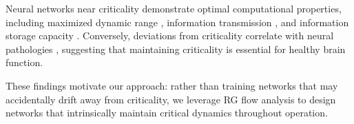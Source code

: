 Neural networks near criticality demonstrate optimal computational properties, including maximized dynamic range \cite{Kinouchietal2006, Shewetal2009}, information transmission \cite{Beggsetal2012}, and information storage capacity \cite{Bertschingeretal2004}. Conversely, deviations from criticality correlate with neural pathologies \cite{Meiseletal2011}, suggesting that maintaining criticality is essential for healthy brain function.

These findings motivate our approach: rather than training networks that may accidentally drift away from criticality, we leverage RG flow analysis to design networks that intrinsically maintain critical dynamics throughout operation.
